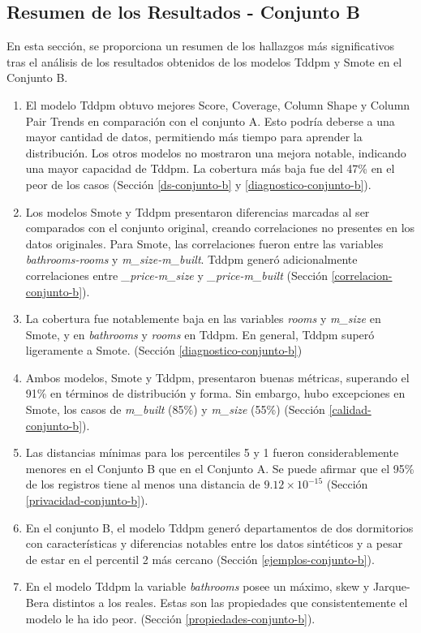 \subsection{Resumen de los Resultados - Conjunto B}
En esta sección, se proporciona un resumen de los hallazgos más significativos tras el análisis
de los resultados obtenidos de los modelos Tddpm y Smote en el Conjunto B.
\begin{enumerate}
    \item El modelo Tddpm obtuvo mejores Score, Coverage, Column Shape y Column Pair Trends en comparación con el conjunto A. Esto podría deberse a una mayor cantidad de datos, permitiendo más tiempo para aprender la distribución. Los otros modelos no mostraron una mejora notable, indicando una mayor capacidad de Tddpm. La cobertura más baja fue del 47\% en el peor de los casos (Sección \ref{ds-conjunto-b} y \ref{diagnostico-conjunto-b}).
    
    \item Los modelos Smote y Tddpm presentaron diferencias marcadas al ser comparados con el conjunto original, creando correlaciones no presentes en los datos originales. Para Smote, las correlaciones fueron entre las variables \emph{bathrooms-rooms} y \emph{m\_size-m\_built}. Tddpm generó adicionalmente correlaciones entre \emph{\_price-m\_size} y \emph{\_price-m\_built} (Sección \ref{correlacion-conjunto-b}).
    
    \item La cobertura fue notablemente baja en las variables \emph{rooms} y \emph{m\_size} en Smote, y en \emph{bathrooms} y \emph{rooms} en Tddpm. En general, Tddpm superó ligeramente a Smote. (Sección \ref{diagnostico-conjunto-b})
    
    \item Ambos modelos, Smote y Tddpm, presentaron buenas métricas, superando el 91\% en términos de distribución y forma. Sin embargo, hubo excepciones en Smote, los casos de \emph{m\_built} (85\%) y \emph{m\_size} (55\%) (Sección \ref{calidad-conjunto-b}).
    
    \item Las distancias mínimas para los percentiles 5 y 1 fueron considerablemente menores en el Conjunto B que en el Conjunto A. Se puede afirmar que el 95\% de los registros tiene al menos una distancia de $9.12 \times 10^{-15}$ (Sección \ref{privacidad-conjunto-b}).
    
    \item En el conjunto B, el modelo Tddpm generó departamentos de dos dormitorios con características y diferencias notables entre los datos sintéticos y a pesar de estar en el percentil 2 más cercano (Sección \ref{ejemplos-conjunto-b}).
    
    \item En el modelo Tddpm la variable \emph{bathrooms} posee un máximo, skew y Jarque-Bera distintos a los reales. Estas son las propiedades que consistentemente el modelo le ha ido peor. (Sección \ref{propiedades-conjunto-b}).
\end{enumerate}
